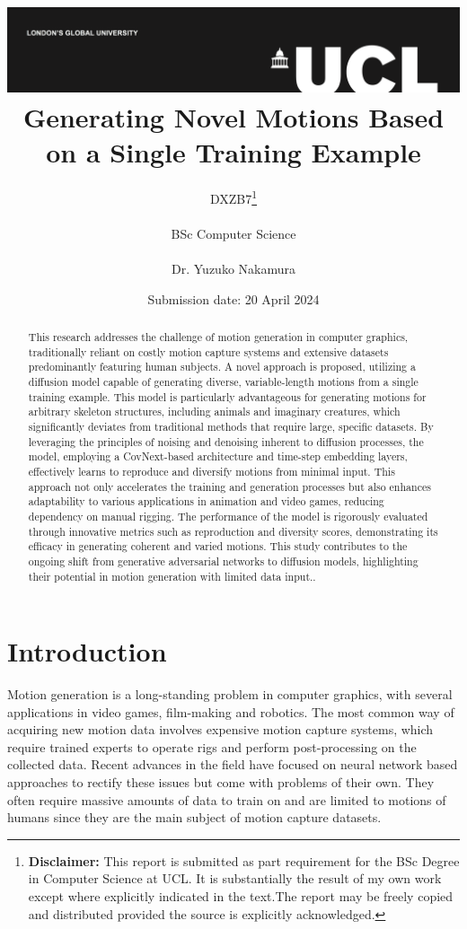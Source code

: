 \documentclass[a4paper, 12pt]{report}
\title{{\vspace{-14em} \includegraphics[scale=0.4]{ucl_logo.png}}\\
{{\Huge Generating Novel Motions Based on a Single Training Example}}\\
}
\date{Submission date: 20 April 2024}
\author{DXZB7\thanks{
{\bf Disclaimer:}
This report is submitted as part requirement for the BSc Degree in Computer Science at UCL. It is substantially the result of my own work except where explicitly indicated in the text.The report may be freely copied and distributed provided the source is explicitly acknowledged.}
\\ \\
BSc Computer Science\\ \\
Dr. Yuzuko Nakamura}
\begin{document}
\onehalfspacing
\maketitle
\begin{abstract}
	This research addresses the challenge of motion generation in computer graphics, traditionally reliant on costly motion capture systems and extensive datasets predominantly featuring human subjects. A novel approach is proposed, utilizing a diffusion model capable of generating diverse, variable-length motions from a single training example. This model is particularly advantageous for generating motions for arbitrary skeleton structures, including animals and imaginary creatures, which significantly deviates from traditional methods that require large, specific datasets. By leveraging the principles of noising and denoising inherent to diffusion processes, the model, employing a CovNext-based architecture and time-step embedding layers, effectively learns to reproduce and diversify motions from minimal input. This approach not only accelerates the training and generation processes but also enhances adaptability to various applications in animation and video games, reducing dependency on manual rigging. The performance of the model is rigorously evaluated through innovative metrics such as reproduction and diversity scores, demonstrating its efficacy in generating coherent and varied motions. This study contributes to the ongoing shift from generative adversarial networks to diffusion models, highlighting their potential in motion generation with limited data input..
\end{abstract}
\tableofcontents
\setcounter{page}{1}


\chapter{Introduction}
Motion generation is a long-standing problem in computer graphics, with several applications in video games, film-making and robotics.
The most common way of acquiring new motion data involves expensive motion capture systems, which require trained experts to operate rigs and perform post-processing on the collected data. Recent advances in the field have focused on neural network based approaches to rectify these issues but come with problems of their own. They often require massive amounts of data to train on and are limited to motions of humans since they are the main subject of motion capture datasets.
\end{document}
